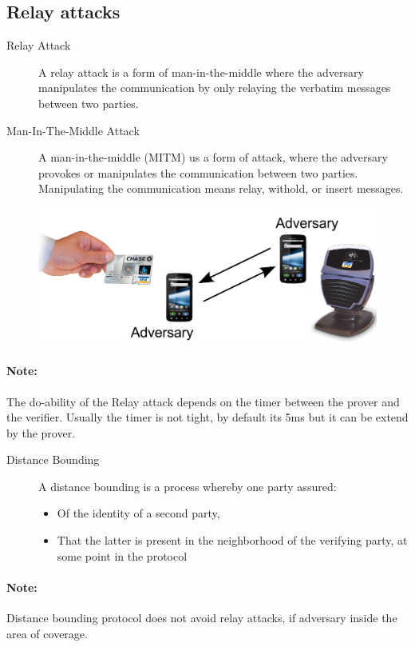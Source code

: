 
\subsection{Relay attacks}
\begin{description}
    \item[Relay Attack] A relay attack is a form of man-in-the-middle where the
    adversary manipulates the communication by only relaying the verbatim
    messages between two parties.
    \item[Man-In-The-Middle Attack] A man-in-the-middle (MITM) us a form of
    attack, where the adversary provokes or manipulates the communication
    between two parties. Manipulating the communication means relay, withold, or
    insert messages.
\end{description}

\begin{figure}[ht!]
    \centering
    \includegraphics[width=0.7\columnwidth]{img/relay-attack}
\end{figure}
\paragraph{Note:} The do-ability of the Relay attack depends on the timer
between the prover and the verifier. Usually the timer is not tight, by default
its 5ms but it can be extend by the prover.


\begin{description}
    \item[Distance Bounding] A distance bounding is a process whereby one party
    assured:
    \begin{itemize}
        \item Of the identity of a second party,
        \item That the latter is present in the neighborhood of the verifying
        party, at some point in the protocol
    \end{itemize}
\end{description}
\paragraph{Note:} Distance bounding protocol does not avoid relay attacks, if
adversary inside the area of coverage.


